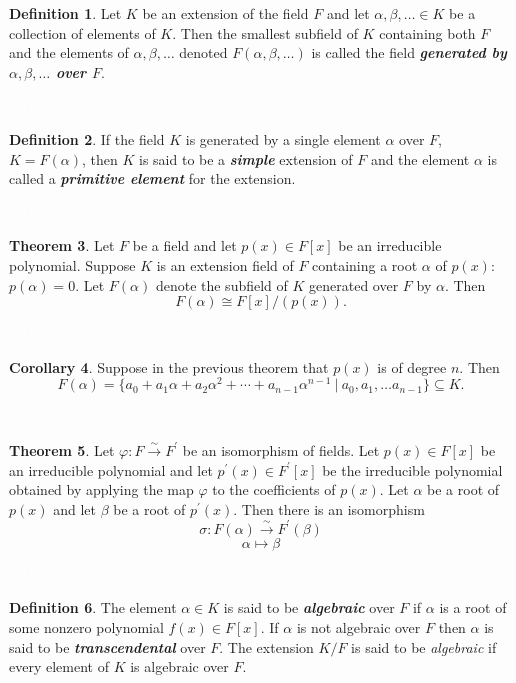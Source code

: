 \documentclass{article}
\theoremstyle{definition}
\newtheorem{thm}{Theorem}[section]
\newtheorem{cor}[thm]{Corollary}
\newtheorem{defn}[thm]{Definition}
\newcommand{\nl}{\textcolor{white}{nothing}}
\newcommand{\ra}{\rightarrow}
\newcommand{\p}{\prime}
\newcommand{\seq}{\subseteq}
\newcommand{\al}{\alpha}
\newcommand{\be}{\beta}
\newcommand{\vphi}{\varphi}
\begin{document}
\begin{defn}
Let $K$ be an extension of the field $F$ and let $\al,\be,\ldots\in K$ be a collection of elements of $K$. Then the smallest subfield of $K$ containing both $F$ and the elements of $\al,\be,\ldots$ denoted $F(\al,\be,\ldots)$ is called the field \textbf{\textit{generated by $\al,\be,\ldots$ over $F$}}.
\end{defn}

\nl

\begin{defn}
If the field $K$ is generated by a single element $\al$ over $F$, $K = F(\al)$, then $K$ is said to be a \textit{\textbf{simple}} extension of $F$ and the element $\al$ is called a \textit{\textbf{primitive element}} for the extension.
\end{defn}

\nl

\begin{thm}
Let $F$ be a field and let $p(x) \in F[x]$ be an irreducible polynomial. Suppose $K$ is an extension field of $F$ containing a root $\al$ of $p(x)$: $p(\al) = 0$. Let $F(\al)$ denote the subfield of $K$ generated over $F$ by $\al$. Then
\[F(\al) \cong F[x]/(p(x)).\]
\end{thm}

\nl

\begin{cor}
Suppose in the previous theorem that $p(x)$ is of degree $n$. Then
\[F(\al) = \{a_0 + a_1\al + a_2\al^2 + \cdots + a_{n - 1}\al^{n - 1} \ |\ a_0, a_1, \ldots a_{n - 1}\}\seq K.\]
\end{cor}

\nl

\begin{thm}
Let $\vphi: F\overset{\sim}{\ra} F^\p$ be an isomorphism of fields. Let $p(x)\in F[x]$ be an irreducible polynomial and let $p^\p(x)\in F^\p[x]$ be the irreducible polynomial obtained by applying the map $\vphi$ to the coefficients of $p(x)$. Let $\al$ be a root of $p(x)$ and let $\be$ be a root of $p^\p(x)$. Then there is an isomorphism 
\[\sigma:F(\al)\overset{\sim}\longrightarrow F^\p(\be)\]
\[\al\longmapsto \be\]
\end{thm}

\nl

\begin{defn}
The element $\al\in K$ is said to be \textit{\textbf{algebraic}} over $F$ if $\al$ is a root of some nonzero polynomial $f(x)\in F[x]$. If $\al$ is not algebraic over $F$ then $\al$ is said to be \textit{\textbf{transcendental}} over $F$. The extension $K/F$ is said to be \textit{algebraic} if every element of $K$ is algebraic over $F$.
\end{defn}
\end{document}
